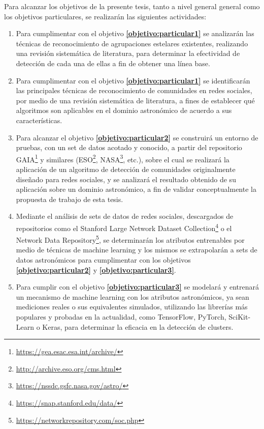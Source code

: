 \documentclass[
	11pt,oneside,a4paper,
	headsepline,footsepline,
	fleqn,
]{memoir}
\renewcommand\fbox{\fcolorbox{gray!50}{white}}
\begin{document}
Para alcanzar los objetivos de la presente tesis, tanto a nivel general general como los objetivos particulares, se realizarán las siguientes actividades:


\begin{enumerate}[label*=\fbox{A\arabic*}]
	\item Para cumplimentar con el objetivo \textbf{\ref{objetivo:particular1}} se analizarán las técnicas de reconocimiento de agrupaciones estelares existentes, realizando una revisión sistemática de literatura, para determinar la efectividad de detección de cada una de ellas a fin de obtener una línea base.
	
	\item Para cumplimentar con el objetivo \textbf{\ref{objetivo:particular1}} se identificarán las principales técnicas de reconocimiento de comunidades en redes sociales, por medio de una revisión sistemática de literatura, a fines de establecer qué algoritmos son aplicables en el dominio astronómico de acuerdo a sus características.
	
	\item Para alcanzar el objetivo \textbf{\ref{objetivo:particular2}} se construirá un entorno de pruebas, con un set de datos acotado y conocido, a partir del repositorio GAIA\footnote{\url{https://gea.esac.esa.int/archive/}} y similares (ESO\footnote{\url{http://archive.eso.org/cms.html}}, NASA\footnote{\url{https://nssdc.gsfc.nasa.gov/astro/}}, etc.), sobre el cual se realizará la aplicación de un algoritmo de detección de comunidades originalmente diseñado para redes sociales, y se analizará el resultado obtenido de su aplicación sobre un dominio astronómico, a fin de validar conceptualmente la propuesta de trabajo de esta tesis.
	
	\item Mediante el análisis de sets de datos de redes sociales,
	descargados de repositorios como el Stanford Large Network Dataset Collection\footnote{\url{https://snap.stanford.edu/data/}} o el Network Data Repository\footnote{\url{https://networkrepository.com/soc.php}}, se determinarán los atributos entrenables por medio de técnicas de machine learning y los mismos se extrapolarán a sets de datos astronómicos para cumplimentar con los objetivos \textbf{\ref{objetivo:particular2}} y \textbf{\ref{objetivo:particular3}}.
		
	\item Para cumplir con el objetivo \textbf{\ref{objetivo:particular3}} se modelará y entrenará un mecanismo de machine learning con los atributos astronómicos, ya sean mediciones reales o sus equivalentes simulados, utilizando las librerías más populares y probadas en la actualidad, como TensorFlow, PyTorch, SciKit-Learn o Keras, para determinar la eficacia en la detección de clusters.
	

\end{enumerate}
\end{document}
